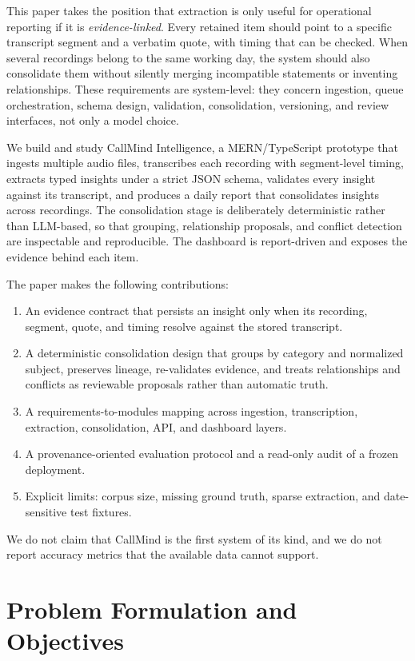 \documentclass[10pt,a4paper]{article}
\begin{document}
This paper takes the position that extraction is only useful for operational reporting if
it is \emph{evidence-linked}. Every retained item should point to a specific transcript
segment and a verbatim quote, with timing that can be checked. When several recordings
belong to the same working day, the system should also consolidate them without silently
merging incompatible statements or inventing relationships. These requirements are
system-level: they concern ingestion, queue orchestration, schema design, validation,
consolidation, versioning, and review interfaces, not only a model choice.

We build and study CallMind Intelligence, a MERN/TypeScript prototype that ingests
multiple audio files, transcribes each recording with segment-level timing, extracts typed
insights under a strict JSON schema, validates every insight against its transcript, and
produces a daily report that consolidates insights across recordings. The consolidation
stage is deliberately deterministic rather than LLM-based, so that grouping, relationship
proposals, and conflict detection are inspectable and reproducible. The dashboard is
report-driven and exposes the evidence behind each item.

The paper makes the following contributions:
\begin{enumerate}
\item An evidence contract that persists an insight only when its recording, segment,
quote, and timing resolve against the stored transcript.
\item A deterministic consolidation design that groups by category and normalized subject,
preserves lineage, re-validates evidence, and treats relationships and conflicts as
reviewable proposals rather than automatic truth.
\item A requirements-to-modules mapping across ingestion, transcription, extraction,
consolidation, API, and dashboard layers.
\item A provenance-oriented evaluation protocol and a read-only audit of a frozen
deployment.
\item Explicit limits: corpus size, missing ground truth, sparse extraction, and
date-sensitive test fixtures.
\end{enumerate}

We do not claim that CallMind is the first system of its kind, and we do not report
accuracy metrics that the available data cannot support.

\section{Problem Formulation and Objectives}
\end{document}
